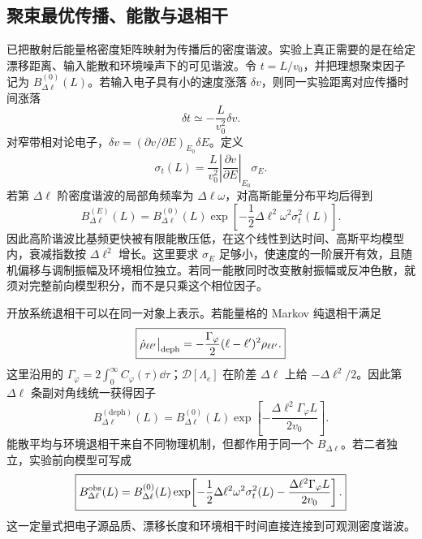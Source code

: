 
\subsection{聚束最优传播、能散与退相干}\label{subsec:bunching-decoherence-closure-dp47}

 已把散射后能量格密度矩阵映射为传播后的密度谐波。实验上真正需要的是在给定漂移距离、输入能散和环境噪声下的可见谐波。令 $t=L/v_0$，并把理想聚束因子记为 $B_{\Delta\ell}^{(0)}(L)$。若输入电子具有小的速度涨落 $\delta v$，则同一实验距离对应传播时间涨落
\begin{equation*}
 \delta t\simeq-\frac{L}{v_0^2}\delta v.
\end{equation*}
对窄带相对论电子，$\delta v=(\partial v/\partial E)_{E_0}\delta E$。定义
\begin{equation}
\boxed{
 \sigma_t(L)
 =\frac{L}{v_0^2}
 \left|\frac{\partial v}{\partial E}\right|_{E_0}\sigma_E .}
\label{eq:arrival_time_jitter_energy_spread_dp47}
\end{equation}
若第 $\Delta\ell$ 阶密度谐波的局部角频率为 $\Delta\ell\omega$，对高斯能量分布平均后得到
\begin{equation}
\boxed{
 B_{\Delta\ell}^{(E)}(L)
 =B_{\Delta\ell}^{(0)}(L)
 \exp\!\left[-\frac12\Delta\ell^2\omega^2\sigma_t^2(L)\right].}
\label{eq:bunching_energy_spread_damping_dp47}
\end{equation}
因此高阶谐波比基频更快被有限能散压低，在这个线性到达时间、高斯平均模型内，衰减指数按 $\Delta\ell^2$ 增长。这里要求 $\sigma_E$ 足够小，使速度的一阶展开有效，且随机偏移与调制振幅及环境相位独立。若同一能散同时改变散射振幅或反冲色散，就须对完整前向模型积分，而不是只乘这个相位因子。

开放系统退相干可以在同一对象上表示。若能量格的 Markov 纯退相干满足
\begin{equation}
\boxed{
 \dot\rho_{\ell\ell'}\big|_{\rm deph}
 =-\frac{\Gamma_\varphi}{2}(\ell-\ell')^2\rho_{\ell\ell'}.}
\label{eq:bunching_pure_dephasing_master_dp68}
\end{equation}
这里沿用的 $\Gamma_\varphi=2\int_0^\infty C_\varphi(\tau)\dd\tau$；$\mathcal D[\Lambda_e]$ 在阶差 $\Delta\ell$ 上给 $-\Delta\ell^2/2$。因此第 $\Delta\ell$ 条副对角线统一获得因子
\begin{equation}
\boxed{
 B_{\Delta\ell}^{(\mathrm{deph})}(L)
 =B_{\Delta\ell}^{(0)}(L)
 \exp\!\left[-\frac{\Delta\ell^2\Gamma_\varphi L}{2v_0}\right].}
\label{eq:bunching_dephasing_damping_dp47}
\end{equation}
能散平均与环境退相干来自不同物理机制，但都作用于同一个 $B_{\Delta\ell}$。若二者独立，实验前向模型可写成
\begin{equation}
\boxed{
 B_{\Delta\ell}^{\rm obs}(L)
 =B_{\Delta\ell}^{(0)}(L)
 \exp\!\left[-\frac12\Delta\ell^2\omega^2\sigma_t^2(L)
 -\frac{\Delta\ell^2\Gamma_\varphi L}{2v_0}\right].}
\label{eq:bunching_observed_master_dp47}
\end{equation}
这一定量式把电子源品质、漂移长度和环境相干时间直接连接到可观测密度谐波。

